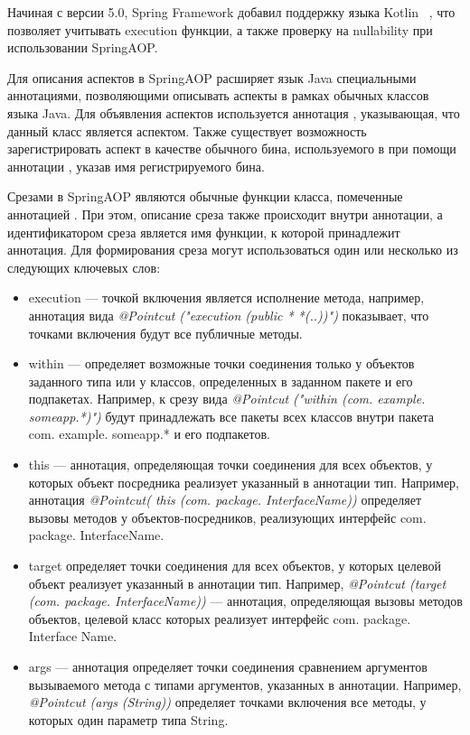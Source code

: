 Начиная с версии 5.0, Spring Framework добавил поддержку языка Kotlin
~\cite{springAOP_5_release}, что позволяет учитывать execution функции, а также
проверку на nullability при использовании SpringAOP.

Для описания аспектов в SpringAOP расширяет язык Java специальными аннотациями,
позволяющими описывать аспекты в рамках обычных классов языка Java.
Для объявления аспектов используется аннотация , указывающая,
что данный класс является аспектом.
Также существует возможность зарегистрировать аспект в качестве обычного бина,
используемого в  при помощи аннотации
, указав имя регистрируемого бина.

Срезами в SpringAOP являются обычные функции класса, помеченные аннотацией
.
При этом, описание среза также происходит внутри аннотации, а идентификатором
среза является имя функции, к которой принадлежит аннотация.
Для формирования среза могут использоваться один или несколько из следующих 
ключевых слов:
  \begin{itemize}
    \item execution --- точкой включения является исполнение метода, 
      например, аннотация вида \textit{@Pointcut ("execution (public * 
      *(..))")} показывает, что точками включения будут все публичные методы.
    \item within --- определяет возможные точки соединения только у объектов 
      заданного типа или у классов, определенных в заданном пакете и его 
      подпакетах.
      Например, к срезу вида \textit{@Pointcut ("within (com. example.
      someapp.*)")} будут принадлежать все пакеты всех классов внутри пакета
      com. example. someapp.* и его подпакетов.
    \item this --- аннотация, определяющая точки соединения для всех объектов,
      у которых объект посредника реализует указанный в аннотации тип.
      Например, аннотация \textit{@Pointcut( this (com. package.
      InterfaceName))} определяет вызовы методов у объектов-посредников,
      реализующих интерфейс com. package. InterfaceName.
    \item target определяет точки соединения для всех объектов, у которых 
      целевой объект реализует указанный в аннотации тип.
      Например, \textit{@Pointcut (target (com. package. InterfaceName))} ---
      аннотация, определяющая вызовы методов объектов, целевой класс которых
      реализует интерфейс com. package. Interface Name.
    \item args --- аннотация определяет точки соединения сравнением аргументов
      вызываемого метода с типами аргументов, указанных в аннотации.
      Например, \textit{@Pointcut (args (String))} определяет точками включения
      все методы, у которых один параметр типа String.
  \end{itemize}
  
